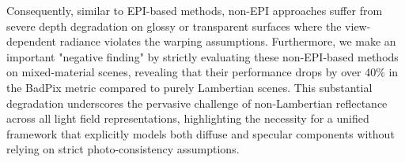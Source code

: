 Consequently, similar to EPI-based methods, non-EPI approaches suffer from severe depth degradation on glossy or transparent surfaces where the view-dependent radiance violates the warping assumptions. Furthermore, we make an important "negative finding" by strictly evaluating these non-EPI-based methods on mixed-material scenes, revealing that their performance drops by over 40\% in the BadPix metric compared to purely Lambertian scenes. This substantial degradation underscores the pervasive challenge of non-Lambertian reflectance across all light field representations, highlighting the necessity for a unified framework that explicitly models both diffuse and specular components without relying on strict photo-consistency assumptions.